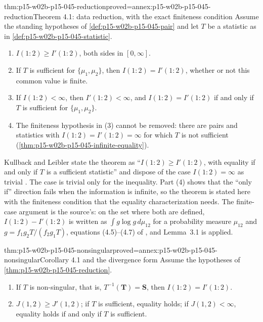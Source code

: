 \begin{hbtheorem}{thm:p15-w02b-p15-045-reduction}{proved=annex:p15-w02b-p15-045-reduction}{Theorem 4.1: data reduction, with the exact finiteness condition}
Assume the standing hypotheses of \cref{def:p15-w02b-p15-045-pair} and
let \(T\) be a statistic as in \cref{def:p15-w02b-p15-045-statistic}.
\begin{enumerate}
\item \(I(1:2)\geq I'(1:2)\), both sides in \([0,\infty]\).
\item If \(T\) is sufficient for \(\{\mu_1,\mu_2\}\), then
\(I(1:2)=I'(1:2)\), whether or not this common value is finite.
\item If \(I(1:2)<\infty\), then \(I'(1:2)<\infty\), and
\(I(1:2)=I'(1:2)\) if and only if \(T\) is sufficient for
\(\{\mu_1,\mu_2\}\).
\item The finiteness hypothesis in (3) cannot be removed: there are
pairs and statistics with \(I(1:2)=I'(1:2)=\infty\) for which \(T\)
is not sufficient (\cref{thm:p15-w02b-p15-045-infinite-equality}).
\end{enumerate}
\end{hbtheorem}

Kullback and Leibler state the theorem as ``\(I(1:2)\geq I'(1:2)\), with
equality if and only if \(T\) is a sufficient statistic'' and dispose of
the case \(I(1:2)=\infty\) as trivial
\cite[p.~83]{KullbackLeibler1951Information}. The case is trivial only
for the inequality. Part (4) shows that the ``only if'' direction fails
when the information is infinite, so the theorem is stated here with the
finiteness condition that the equality characterization needs. The
finite-case argument is the source's: on the set where both are
defined, \(I(1:2)-I'(1:2)\) is written as \(\int g\log g\,d\mu_{12}\) for a
probability measure \(\mu_{12}\) and \(g=f_1g_2T/(f_2g_1T)\), equations
(4.5)--(4.7) of \cite[pp.~83--84]{KullbackLeibler1951Information}, and
Lemma~3.1 is applied.

\begin{hbcorollary}{thm:p15-w02b-p15-045-nonsingular}{proved=annex:p15-w02b-p15-045-nonsingular}{Corollary 4.1 and the divergence form}
Assume the hypotheses of \cref{thm:p15-w02b-p15-045-reduction}.
\begin{enumerate}
\item If \(T\) is non-singular, that is, \(T^{-1}(\mathbf T)=\mathbf S\),
then \(I(1:2)=I'(1:2)\).
\item \(J(1,2)\geq J'(1,2)\); if \(T\) is sufficient, equality holds;
if \(J(1,2)<\infty\), equality holds if and only if \(T\) is
sufficient.
\end{enumerate}
\end{hbcorollary}

